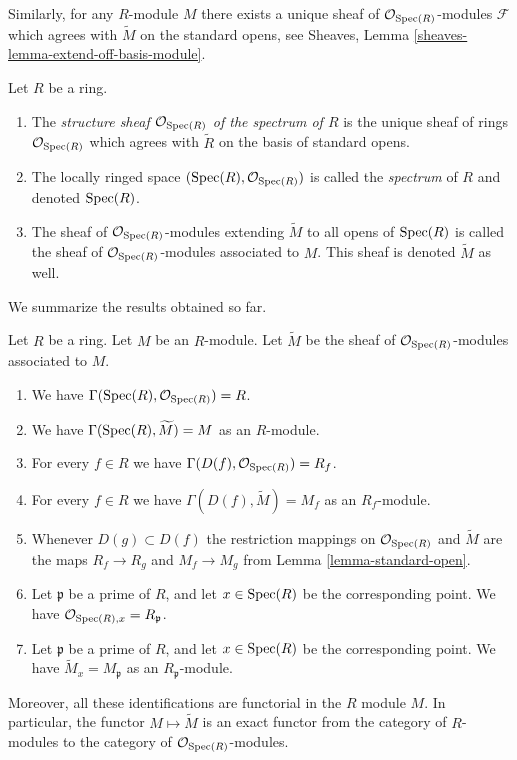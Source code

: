 \medskip\noindent
Similarly, for any $R$-module $M$ there exists
a unique sheaf of $\mathcal{O}_{\mathop{\mathrm{Spec}}(R)}$-modules
$\mathcal{F}$ which agrees with $\widetilde M$ on the
standard opens, see
Sheaves, Lemma \ref{sheaves-lemma-extend-off-basis-module}.

\begin{definition}
\label{definition-structure-sheaf}
Let $R$ be a ring.
\begin{enumerate}
\item The {\it structure sheaf $\mathcal{O}_{\mathop{\mathrm{Spec}}(R)}$ of the
spectrum of $R$} is the unique sheaf of rings $\mathcal{O}_{\mathop{\mathrm{Spec}}(R)}$
which agrees with $\widetilde R$ on the basis of standard opens.
\item The locally ringed space
$(\mathop{\mathrm{Spec}}(R), \mathcal{O}_{\mathop{\mathrm{Spec}}(R)})$ is called
the {\it spectrum} of $R$ and denoted $\mathop{\mathrm{Spec}}(R)$.
\item The sheaf of $\mathcal{O}_{\mathop{\mathrm{Spec}}(R)}$-modules
extending $\widetilde M$ to all opens of $\mathop{\mathrm{Spec}}(R)$
is called the sheaf of $\mathcal{O}_{\mathop{\mathrm{Spec}}(R)}$-modules
associated to $M$. This sheaf is denoted $\widetilde M$ as
well.
\end{enumerate}
\end{definition}

\noindent
We summarize the results obtained so far.

\begin{lemma}
\label{lemma-spec-sheaves}
Let $R$ be a ring. Let $M$ be an $R$-module. Let $\widetilde M$
be the sheaf of $\mathcal{O}_{\mathop{\mathrm{Spec}}(R)}$-modules
associated to $M$.
\begin{enumerate}
\item We have $\Gamma(\mathop{\mathrm{Spec}}(R), \mathcal{O}_{\mathop{\mathrm{Spec}}(R)}) = R$.
\item We have $\Gamma(\mathop{\mathrm{Spec}}(R), \widetilde M) = M$ as an $R$-module.
\item For every $f \in R$ we have
$\Gamma(D(f), \mathcal{O}_{\mathop{\mathrm{Spec}}(R)}) = R_f$.
\item For every $f\in R$ we have $\Gamma(D(f), \widetilde M) = M_f$
as an $R_f$-module.
\item Whenever $D(g) \subset D(f)$ the restriction mappings
on $\mathcal{O}_{\mathop{\mathrm{Spec}}(R)}$ and $\widetilde M$
are the maps
$R_f \to R_g$ and $M_f \to M_g$ from Lemma
\ref{lemma-standard-open}.
\item Let $\mathfrak p$ be a prime of $R$, and let $x \in \mathop{\mathrm{Spec}}(R)$
be the corresponding point. We have
$\mathcal{O}_{\mathop{\mathrm{Spec}}(R), x} = R_{\mathfrak p}$.
\item Let $\mathfrak p$ be a prime of $R$, and let $x \in \mathop{\mathrm{Spec}}(R)$
be the corresponding point. We have $\widetilde M_x = M_{\mathfrak p}$
as an $R_{\mathfrak p}$-module.
\end{enumerate}
Moreover, all these identifications are functorial in the $R$
module $M$. In particular, the functor $M \mapsto \widetilde M$
is an exact functor from the category of $R$-modules
to the category of $\mathcal{O}_{\mathop{\mathrm{Spec}}(R)}$-modules.
\end{lemma}


